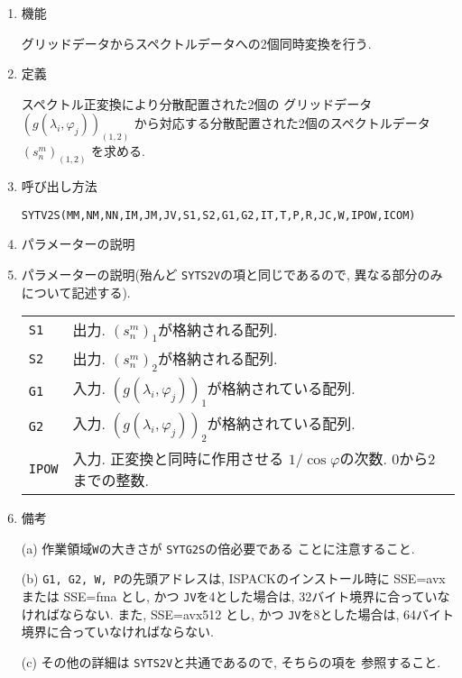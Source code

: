 \documentclass[a4j]{jsarticle}
\begin{document}
\begin{enumerate}

\item 機能

グリッドデータからスペクトルデータへの2個同時変換を行う.

\item 定義

スペクトル正変換により分散配置された2個の
グリッドデータ$(g(\lambda_i,\varphi_j))_{(1,2)}$
から対応する分散配置された2個のスペクトルデータ$(s^m_n)_{(1,2)}$
を求める.

\item 呼び出し方法 

\texttt{SYTV2S(MM,NM,NN,IM,JM,JV,S1,S2,G1,G2,IT,T,P,R,JC,W,IPOW,ICOM)}
  
\item パラメーターの説明

\item パラメーターの説明(殆んど \texttt{SYTS2V}の項と同じであるので,
異なる部分のみについて記述する).
  
\begin{tabular}{ll}
\texttt{S1} & 出力. $(s^m_n)_1$が格納される配列.\\
\texttt{S2} & 出力. $(s^m_n)_2$が格納される配列.\\
\texttt{G1} & 入力. $(g(\lambda_i,\varphi_j))_1$が格納されている配列.\\
\texttt{G2} & 入力. $(g(\lambda_i,\varphi_j))_2$が格納されている配列.\\
\texttt{IPOW} & 入力. 正変換と同時に作用させる
                      $1/\cos\varphi$の次数. 0から2までの整数.
\end{tabular}

\item 備考

(a) 作業領域\texttt{W}の大きさが \texttt{SYTG2S}の倍必要である
      ことに注意すること.

(b) \texttt{G1, G2, W, P}の先頭アドレスは, 
ISPACKのインストール時に SSE=avx または SSE=fma とし, かつ
\texttt{JV}を4とした場合は, 32バイト境界に合っていなければならない.
また, SSE=avx512 とし, かつ
\texttt{JV}を8とした場合は, 64バイト境界に合っていなければならない.

(c) その他の詳細は \texttt{SYTS2V}と共通であるので, そちらの項を
参照すること.

\end{enumerate}

\end{document}
